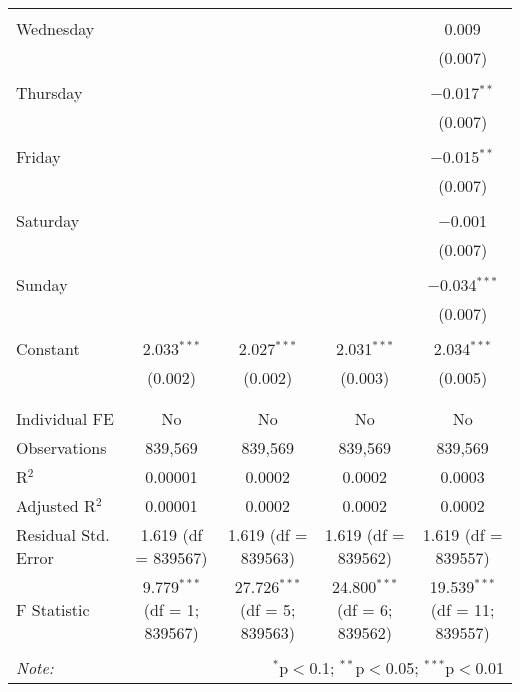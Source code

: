 \documentclass[
]{article}
\begin{document}
\begin{table}[!htbp]
{\begin{tabular}{@{\extracolsep{5pt}}lcccc}
  & & & & \\ 
 Wednesday &  &  &  & 0.009 \\ 
  &  &  &  & (0.007) \\ 
  & & & & \\ 
 Thursday &  &  &  & $-$0.017$^{**}$ \\ 
  &  &  &  & (0.007) \\ 
  & & & & \\ 
 Friday &  &  &  & $-$0.015$^{**}$ \\ 
  &  &  &  & (0.007) \\ 
  & & & & \\ 
 Saturday &  &  &  & $-$0.001 \\ 
  &  &  &  & (0.007) \\ 
  & & & & \\ 
 Sunday &  &  &  & $-$0.034$^{***}$ \\ 
  &  &  &  & (0.007) \\ 
  & & & & \\ 
 Constant & 2.033$^{***}$ & 2.027$^{***}$ & 2.031$^{***}$ & 2.034$^{***}$ \\ 
  & (0.002) & (0.002) & (0.003) & (0.005) \\ 
  & & & & \\ 
\hline \\[-1.8ex] 
Individual FE & No & No & No & No \\ 
Observations & 839,569 & 839,569 & 839,569 & 839,569 \\ 
R$^{2}$ & 0.00001 & 0.0002 & 0.0002 & 0.0003 \\ 
Adjusted R$^{2}$ & 0.00001 & 0.0002 & 0.0002 & 0.0002 \\ 
Residual Std. Error & 1.619 (df = 839567) & 1.619 (df = 839563) & 1.619 (df = 839562) & 1.619 (df = 839557) \\ 
F Statistic & 9.779$^{***}$ (df = 1; 839567) & 27.726$^{***}$ (df = 5; 839563) & 24.800$^{***}$ (df = 6; 839562) & 19.539$^{***}$ (df = 11; 839557) \\ 
\hline 
\hline \\[-1.8ex] 
\textit{Note:}  & \multicolumn{4}{r}{$^{*}$p$<$0.1; $^{**}$p$<$0.05; $^{***}$p$<$0.01} \\ 
\end{tabular}
} 
\end{table} 
\newpage
\end{document}
